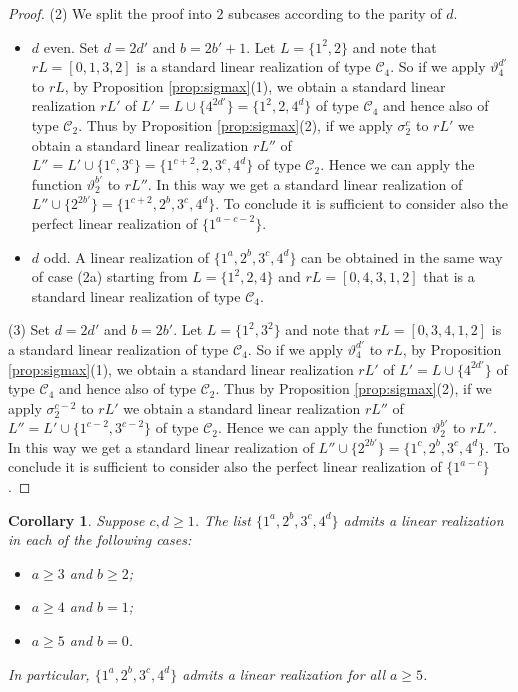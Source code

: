 \documentclass{amsart}
\newtheorem{cor}[prop]{Corollary}
\theoremstyle{definition}
\numberwithin{equation}{section}
\def\C{\mathcal{C}}
\def\th{\vartheta}
\begin{document}
\begin{proof}
\noindent (2) We split the proof into $2$ subcases according to the parity of $d$.
\begin{itemize}
  \item [(2a)] $d$ even.  Set $d=2d'$ and $b=2b'+1$.
Let $L=\{1^2,2\}$ and
note that $rL=[0,1,3,2]$ is a standard linear realization of type $\C_4$.
  So if we apply $\th_4^{d'}$ to $rL$, by Proposition \ref{prop:sigmax}(1),  we obtain a standard linear realization
  $rL'$ of $L'=L\cup \{4^{2d'}\}=\{1^2,2,4^d\}$ of type $\C_4$
and hence also of type $\C_2$.
Thus by Proposition \ref{prop:sigmax}(2), if we apply $\sigma_2^c$ to $rL'$ we obtain a standard linear realization $rL''$ of $L''=L'\cup\{1^{c},3^{c}\}=\{1^{c+2},2,3^c,4^d\}$
of type $\C_2$. Hence we can apply the function $\th_2^{b'}$ to $rL''$. In this way we get a standard  linear realization
of $L''\cup \{2^{2b'}\}=\{1^{c+2},2^b,3^c,4^d\}$.
To conclude it is sufficient to consider also the perfect linear realization of $\{1^{a-c-2}\}$.
  \item [(2b)] $d$ odd. A linear realization of $\{1^a,2^b,3^c,4^d\}$ can be obtained in the same way of case (2a) starting from
$L=\{1^2,2,4\}$ and
$rL=[0,4,3,1,2]$ that is a standard linear realization of type $\C_4$.
\end{itemize}

\noindent (3) Set $d=2d'$ and $b=2b'$.
Let $L=\{1^2,3^2\}$ and
note that $rL=[0,3,4,1,2]$ is a standard linear realization of type $\C_4$.
So if we apply $\th_4^{d'}$ to $rL$, by Proposition \ref{prop:sigmax}(1),  we obtain a standard linear realization $rL'$ of $L'=L\cup \{4^{2d'}\}$ of type $\C_4$
and hence also of type $\C_2$.
Thus by Proposition \ref{prop:sigmax}(2), if we apply $\sigma_2^{c-2}$ to $rL'$ we obtain a standard
linear realization $rL''$ of $L''=L'\cup\{1^{c-2},3^{c-2}\}$
of type $\C_2$. Hence we can apply the function $\th_2^{b'}$ to $rL''$. In this way we get a standard linear realization of $L''\cup \{2^{2b'}\}=\{1^{c},2^b,3^c,4^d\}$.
To conclude it is sufficient to consider also the perfect linear realization of $\{1^{a-c}\}$.
\end{proof}



\begin{cor}\label{cor5}
Suppose $c,d\geq 1$.
The list $\{1^a, 2^b, 3^c, 4^d\}$ admits a linear realization in each of the following cases:
\begin{itemize}
\item[(1)]  $a\geq 3$ and $b\geq 2$;
\item[(2)]  $a\geq 4$ and $b=1$;
\item[(3)]  $a\geq 5$ and $b=0$.
\end{itemize}
In particular, $\{1^a, 2^b, 3^c, 4^d\}$ admits a  linear realization for all $a\geq 5$.
\end{cor}
\end{document}
